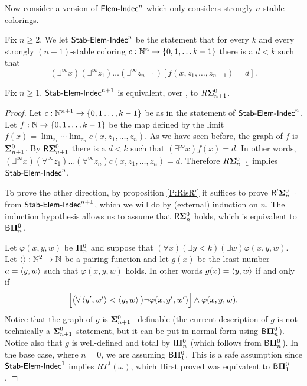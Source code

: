 Now consider a version of $\mathsf{Elem{\mbox{-}}Indec}^n$ which only considers strongly $n$-stable colorings.
\begin{definition}
Fix $n\geq 2$.
We let $\mathsf{Stab{\mbox{-}}Elem{\mbox{-}}Indec}^{n}$ be the statement that for every $k$ and every
strongly $(n-1)$-stable coloring $c:\mathbb{N}^{n}\to\{0,1,\ldots k-1\}$
there is a $d<k$ such that
$$(\exists^\infty x)(\exists^\infty z_1)\ldots(\exists^\infty z_{n-1})[f(x,z_1,\ldots,z_{n-1})=d].$$
\end{definition}

\begin{prop}\label{P:SEIndec&Reg}
Fix $n\geq 1$.  $\mathsf{Stab{\mbox{-}}Elem{\mbox{-}}Indec}^{n+1}$ is equivalent, over \RCAo, to $R{\mathbf{\Sigma}^0_{n+1}}$.
\end{prop}
\begin{proof}
Let $c:\mathbb{N}^{n+1}\to\{0,1\ldots, k-1\}$ be as in the statement of $\mathsf{Stab{\mbox{-}}Elem{\mbox{-}}Indec}^n$.
Let $f:\mathbb{N}\to\{0,1\ldots, k-1\}$ be the map defined by the limit
$f(x) = \lim_{z_1} \cdots \lim_{z_n} c(x,z_1,\dots,z_n)$.
As we have seen before, the graph of $f$ is $\mathbf{\Sigma}^0_{n+1}$.
By $\mathsf{R}{\mathbf{\Sigma}^0_{n+1}}$ there is a $d<k$ such that $(\exists^\infty{x})f(x)=d$.
In other words, $(\exists^\infty{x})(\forall^\infty {z_1})\ldots(\forall^\infty {z_n})c(x,z_1,\ldots,z_n)=d$.
Therefore $R{\mathbf{\Sigma}^0_{n+1}}$ implies $\mathsf{Stab{\mbox{-}}Elem{\mbox{-}}Indec}^{n}$.

To prove the other direction, by proposition \ref{P:RisR'} it suffices to prove
$\mathsf{R}'{\mathbf{\Sigma}^0_{n+1}}$ from $\mathsf{Stab{\mbox{-}}Elem{\mbox{-}}Indec}^{n+1}$, which we will do by (external) induction on $n$.
The induction hypothesis allows us to assume that $\mathsf{R}\mathbf{\Sigma}^0_{n}$ holds,
which is equivalent to $\mathsf{B}{\mathbf{\Pi}^0_{n}}$.

Let $\varphi(x,y,w)$ be $\mathbf{\Pi}^0_{n}$ and suppose that
$(\forall x)(\exists y<k)(\exists w)\varphi(x,y,w)$.
Let $\left\langle \right\rangle:\mathbb{N}^2\to\mathbb{N}$ be a pairing function
and let $g(x)$ be the least number $a=\left\langle y,w\right\rangle$ such that $\varphi(x,y,w)$ holds.
In other words $g(x)=\left\langle y,w\right\rangle$ if and only if
$$\Big[\big(\forall\left\langle y',w'\right\rangle<\left\langle y,w\right\rangle\big)\neg\varphi(x,y',w')\Big]\land\varphi(x,y,w).$$
Notice that the graph of $g$ is $\mathbf{\Sigma}^0_{n+1}-$definable
(the current description of $g$ is not technically a $\mathbf{\Sigma}^0_{n+1}$
statement, but it can be put in normal form using $\mathsf{B}{\mathbf{\Pi}^0_n}$).
Notice also that $g$ is well-defined and total by $\mathsf{I}{\mathbf{\Pi}^0_n}$
(which follows from $\mathsf{B}{\mathbf{\Pi}^0_n}$).
In the base case, where $n=0$, we are assuming $\mathsf{B}{\mathbf{\Pi}^0_1}$.
This is a safe assumption since $\mathsf{Stab{\mbox{-}}Elem{\mbox{-}}Indec}^1$ implies $RT^1(\omega)$,
which Hirst proved was equivalent to $\mathsf{B}{\mathbf{\Pi}^0_1}$ \cite{Hirst:thesis}.


\end{proof}
